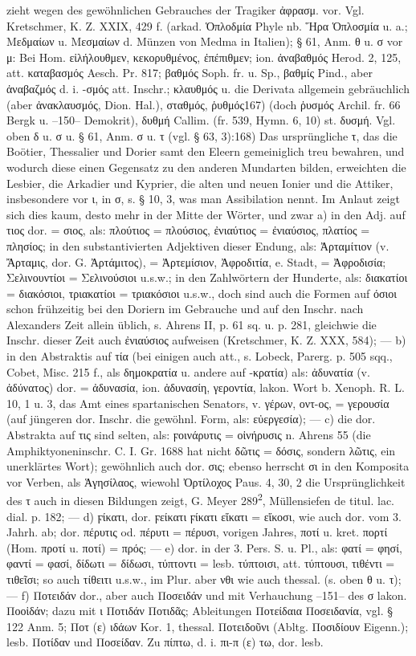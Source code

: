 zieht wegen des gewöhnlichen Gebrauches der Tragiker ἀφρασμ. vor. Vgl. Kretschmer, K. Z. XXIX, 429 f. (arkad. Ὁπλοδμία Phyle nb. Ἥρα Ὁπλοσμία u. a.; Μεδμαίων u. Μεσμαίων d. Münzen von Medma in Italien); § 61, Anm. θ u. σ vor μ: Bei Hom. εἰλήλουθμεν, κεκορυθμένος, ἐπέπιθμεν; ion. ἀναβαθμός Herod. 2, 125, att. καταβασμός Aesch. Pr. 817; βαθμός Soph. fr. u. Sp., βαθμίς Pind., aber ἀναβαζμός d. i. -σμός att. Inschr.; κλαυθμός u. die Derivata allgemein gebräuchlich (aber ἀνακλαυσμός, Dion. Hal.), σταθμός, ῥυθμός167) (doch ῥυσμός Archil. fr. 66 Bergk u. --150-- Demokrit), δυθμή Callim. (fr. 539, Hymn. 6, 10) st. δυσμή. Vgl. oben δ u. σ u. § 61, Anm. σ u. τ (vgl. § 63, 3):168) Das ursprüngliche τ, das die Boötier, Thessalier und Dorier samt den Eleern gemeiniglich treu bewahren, und wodurch diese einen Gegensatz zu den anderen Mundarten bilden, erweichten die Lesbier, die Arkadier und Kyprier, die alten und neuen Ionier und die Attiker, insbesondere vor ι, in σ, s. § 10, 3, was man Assibilation nennt. Im Anlaut zeigt sich dies kaum, desto mehr in der Mitte der Wörter, und zwar a) in den Adj. auf τιος dor. = σιος, als: πλούτιος = πλούσιος, ἐνιαύτιος = ἐνιαύσιος, πλατίος = πλησίος; in den substantivierten Adjektiven dieser Endung, als: Ἀρταμίτιον (v. Ἄρταμις, dor. G. Ἀρτάμιτος), = Ἀρτεμίσιον, Ἀφροδιτία, e. Stadt, = Ἀφροδισία; Σελινουντίοι = Σελινούσιοι u.s.w.; in den Zahlwörtern der Hunderte, als: διακατίοι = διακόσιοι, τριακατίοι = τριακόσιοι u.s.w., doch sind auch die Formen auf όσιοι schon frühzeitig bei den Doriern im Gebrauche und auf den Inschr. nach Alexanders Zeit allein üblich, s. Ahrens II, p. 61 sq. u. p. 281, gleichwie die Inschr. dieser Zeit auch ἐνιαύσιος aufweisen (Kretschmer, K. Z. XXX, 584); — b) in den Abstraktis auf τία (bei einigen auch att., s. Lobeck, Parerg. p. 505 sqq., Cobet, Misc. 215 f., als δημοκρατία u. andere auf -κρατία) als: ἀδυνατία (v. ἀδύνατος) dor. = ἀδυνασία, ion. ἀδυνασίη, γεροντία, lakon. Wort b. Xenoph. R. L. 10, 1 u. 3, das Amt eines spartanischen Senators, v. γέρων, οντ-ος, = γερουσία (auf jüngeren dor. Inschr. die gewöhnl. Form, als: εὐεργεσία); — c) die dor. Abstrakta auf τις sind selten, als: ϝοινάρυτις = οἰνήρυσις n. Ahrens 55 (die Amphiktyoneninschr. C. I. Gr. 1688 hat nicht δῶτις = δόσις, sondern λῶτις, ein unerklärtes Wort); gewöhnlich auch dor. σις; ebenso herrscht σι in den Komposita vor Verben, als Ἁγησίλαος, wiewohl Ὀρτίλοχος Paus. 4, 30, 2 die Ursprünglichkeit des τ auch in diesen Bildungen zeigt, G. Meyer 289\textsuperscript{2}, Müllensiefen de titul. lac. dial. p. 182; — d)  ϝίκατι, dor. ϝείκατι ϝίκατι εἴκατι = εἴκοσι, wie auch dor. vom 3. Jahrh. ab; dor. πέρυτις od. πέρυτι = πέρυσι, vorigen Jahres, ποτί u. kret. πορτί (Hom. προτί u. ποτί) = πρός; — e) dor. in der 3. Pers. S. u. Pl., als: φατί = φησί, φαντί = φασί, δίδωτι = δίδωσι, τύπτοντι = lesb. τύπτοισι, att. τύπτουσι, τιθέντι = τιθεῖσι; so auch  τίθειτι u.s.w., im Plur. aber νθι wie auch thessal. (s. oben θ u. τ); — f) Ποτειδάν dor., aber auch Ποσειδάν und mit Verhauchung --151-- des σ lakon. Ποοἱδάν; dazu mit ι Ποτιδάν Ποτιδᾶς; Ableitungen Ποτείδαια Ποσειδανία, vgl. § 122 Anm. 5;  Ποτ (ε) ιδάων Kor. 1, thessal. Ποτειδοῦνι (Abltg. Ποσιδίουν Eigenn.); lesb. Ποτίδαν und Ποσείδαν. Zu πίπτω, d. i. πι-π (ε) τω, dor. lesb. 